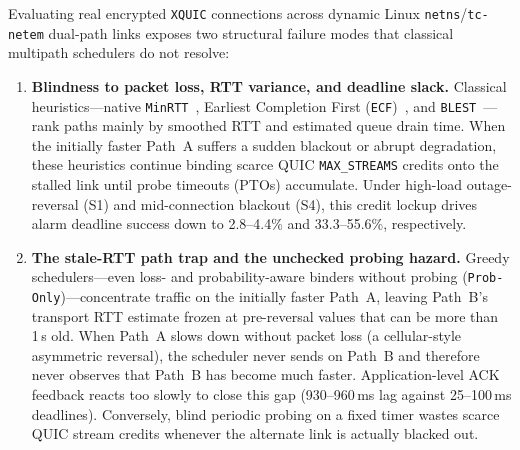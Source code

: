 \documentclass[preprint,12pt,number]{elsarticle}
\begin{document}
Evaluating real encrypted \texttt{XQUIC} connections across dynamic Linux \texttt{netns}/\texttt{tc-netem} dual-path links exposes two structural failure modes that classical multipath schedulers do not resolve:
\begin{enumerate}
    \item \textbf{Blindness to packet loss, RTT variance, and deadline slack.} Classical heuristics---native \texttt{MinRTT}~\cite{rfc8684}, Earliest Completion First (\texttt{ECF})~\cite{lim2017ecf}, and \texttt{BLEST}~\cite{ferlin2016blest}---rank paths mainly by smoothed RTT and estimated queue drain time. When the initially faster Path~A suffers a sudden blackout or abrupt degradation, these heuristics continue binding scarce QUIC \texttt{MAX\_STREAMS} credits onto the stalled link until probe timeouts (PTOs) accumulate. Under high-load outage-reversal (S1) and mid-connection blackout (S4), this credit lockup drives alarm deadline success down to 2.8--4.4\% and 33.3--55.6\%, respectively.
    \item \textbf{The stale-RTT path trap and the unchecked probing hazard.} Greedy schedulers---even loss- and probability-aware binders without probing (\texttt{Prob-Only})---concentrate traffic on the initially faster Path~A, leaving Path~B's transport RTT estimate frozen at pre-reversal values that can be more than 1\,s old. When Path~A slows down without packet loss (a cellular-style asymmetric reversal), the scheduler never sends on Path~B and therefore never observes that Path~B has become much faster. Application-level ACK feedback reacts too slowly to close this gap (930--960\,ms lag against 25--100\,ms deadlines). Conversely, blind periodic probing on a fixed timer wastes scarce QUIC stream credits whenever the alternate link is actually blacked out.
\end{enumerate}
\end{document}
